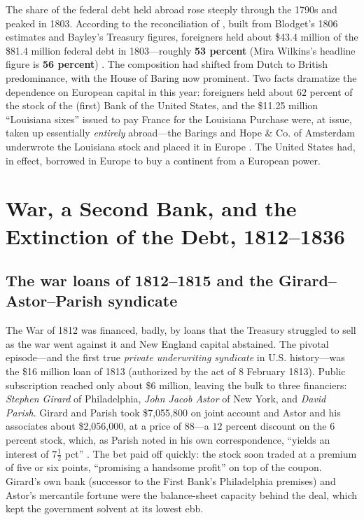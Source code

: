\documentclass[12pt]{article}
\begin{document}
The share of the federal debt held abroad rose steeply through the 1790s and
peaked in 1803. According to the reconciliation of \citet{syllawilsonwright2006},
built from Blodget's 1806 estimates and Bayley's Treasury figures, foreigners
held about \$43.4 million of the \$81.4 million federal debt in 1803---roughly
\textbf{53 percent} (Mira Wilkins's headline figure is \textbf{56 percent})
\citep{wilkins1989history, blodget1806economica}. The composition had shifted
from Dutch to British predominance, with the House of Baring now prominent.
Two facts dramatize the dependence on European capital in this year:
foreigners held about $62$ percent of the stock of the (first) Bank of the
United States, and the \$11.25 million ``Louisiana sixes'' issued to pay France
for the Louisiana Purchase were, at issue, taken up essentially \emph{entirely}
abroad---the Barings and Hope \& Co. of Amsterdam underwrote the Louisiana
stock and placed it in Europe \citep{syllawilsonwright2006}. The United States
had, in effect, borrowed in Europe to buy a continent from a European power.

\section{War, a Second Bank, and the Extinction of the Debt, 1812--1836}

\subsection{The war loans of 1812--1815 and the Girard--Astor--Parish syndicate}

The War of 1812 was financed, badly, by loans that the Treasury struggled to
sell as the war went against it and New England capital abstained. The pivotal
episode---and the first true \emph{private underwriting syndicate} in U.S.
history---was the \$16 million loan of 1813 (authorized by the act of 8 February
1813). Public subscription reached only about \$6 million, leaving the bulk to
three financiers: \emph{Stephen Girard} of Philadelphia, \emph{John Jacob Astor}
of New York, and \emph{David Parish}. Girard and Parish took \$7{,}055{,}800 on
joint account and Astor and his associates about \$2{,}056{,}000, at a price of
$88$---a $12$ percent discount on the $6$ percent stock, which, as Parish noted
in his own correspondence, ``yields an interest of $7\tfrac{1}{2}$ pct''
\citep{porter1931astor, adams1978finance, dewey1903financial}. The bet paid off
quickly: the stock soon traded at a premium of five or six points, ``promising a
handsome profit'' on top of the coupon. Girard's own bank (successor to the
First Bank's Philadelphia premises) and Astor's mercantile fortune were the
balance-sheet capacity behind the deal, which kept the government solvent at its
lowest ebb.
\end{document}
